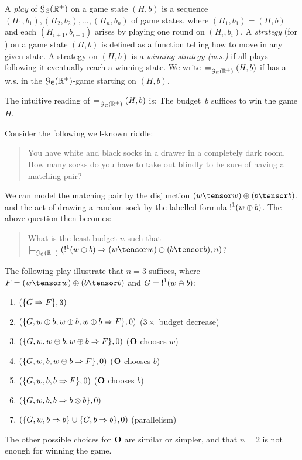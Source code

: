 \begin{definition}
A {\em play} of $\mathcal{G}_{\mathcal{C}}(\mathbb{R}^+)$ on a game state $(H,b)$ is a sequence $(H_1,b_1),(H_2,b_2),\ldots,(H_n,b_n)$ of game states, where $(H_1,b_1)=(H,b)$ and each $(H_{i+1},b_{i+1})$ arises by playing one round on $(H_i,b_i)$.
 A {\em strategy} (for \I) on a game state $(H,b)$ is defined as a function telling \I how to move in any given state. 
 A strategy on $(H,b)$ is a {\em winning strategy (w.s.)} if all plays following it eventually reach a winning state.
We write $\models^{}_{\mathcal{G}_{\mathcal{C}}(\mathbb{R}^+)}(H,b)$ if \I has a w.s. in the $\mathcal{G}_{\mathcal{C}}(\mathbb{R}^+)$-game starting on $(H,b)$. 
\end{definition}
The intuitive reading of $\models^{}_{\mathcal{G}_{\mathcal{C}}(\mathbb{R}^+)}(H,b)$ is: The budget~$b$ suffices to win the game $H$.

\begin{example}\label{ex:riddle}
Consider the following well-known riddle:
\begin{quote}
You have white and black socks in a drawer in a completely dark room. How many socks do you have to take out blindly to be sure of having a matching pair? 
\end{quote}
We can model the matching pair by the disjunction $(w\tensor w)\oplus(b\tensor b)$, and the act of drawing a random sock by the labelled formula $\hbox{$\mathop{!}^{1}$}(w\oplus b)$. The above question then becomes:
\begin{quote}
What is the least budget $n$  such that $\wins{}{\GAIMALLR}(\nbang{1}(w\oplus b)\seq (w\tensor w)\oplus(b\tensor b),n)$?
\end{quote}
The following play illustrate that $n=3$ suffices, where $F=(w\tensor w)\oplus(b\tensor b)$ and $G=\hbox{$\mathop{!}^{1}$}(w\oplus b)$:
\begin{enumerate}
\item $(\{G\Rightarrow F\},3)$ 
\item $(\{G, w\oplus b, w\oplus b, w\oplus b\Rightarrow F\},0)$ ($3\times$ budget decrease)
\item $(\{G, w, w\oplus b, w\oplus b\Rightarrow F\},0)$ ($\mathbf{O}$ chooses $w$)
\item $(\{G, w, b, w\oplus b\Rightarrow F\},0)$ ($\mathbf{O}$ chooses $b$)
\item $(\{G, w, b, b\Rightarrow F\},0)$ ($\mathbf{O}$ chooses $b$)
\item $(\{G, w, b, b\Rightarrow b\otimes b\},0)$ 
\item $(\{G, w, b\Rightarrow b\}\cup \{G, b\Rightarrow b\},0)$ (parallelism)
\end{enumerate}
The other possible choices for $\mathbf{O}$ are similar or simpler, and that $n=2$ is not enough for winning the game.
\end{example}
